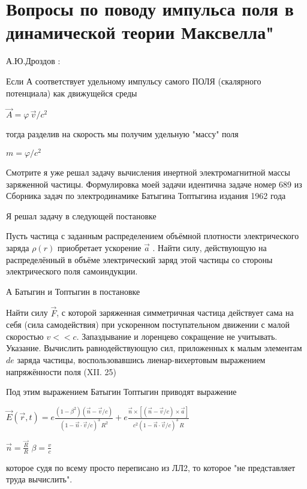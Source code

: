 \documentclass{article}
\begin{document}
 

\section{Вопросы по поводу импульса поля в динамической теории Максвелла"}
А.Ю.Дроздов : 

 Если А соответствует удельному импульсу самого ПОЛЯ (скалярного потенциала) как движущейся среды

$\vec{A} = \varphi\,\vec{v}/c^2$

тогда разделив на скорость мы получим удельную "массу" поля

$m = \varphi/c^2$ 

Смотрите я уже решал задачу вычисления инертной электромагнитной массы заряженной частицы. Формулировка моей задачи идентична задаче номер 689 из Сборника задач по электродинамике Батыгина Топтыгина издания 1962 года

Я решал задачу в следующей постановке

Пусть частица с заданным распределением объёмной плотности электрического заряда $\rho \left( r \right)$ приобретает ускорение $\overrightarrow{a}$ . Найти силу, действующую на распределённый в объёме электрический заряд этой частицы со стороны электрического поля самоиндукции.

А Батыгин и Топтыгин в постановке

Найти силу $\vec{F}$, с которой заряженная симметричная частица действует сама на себя (сила самодействия) при ускоренном поступательном движении с малой скоростью $v << c$. Запаздывание и лоренцево сокращение не учитывать.
Указание. Вычислить равнодействующую сил, приложенных к малым элементам $de$ заряда частицы, воспользовавшись лиенар-вихертовым выражением напряжённости поля (XII. 25)  

Под этим выражением Батыгин Топтыгин приводят выражение

$\vec{E}\left(\vec{r},t\right) = e \frac{\left(1-\beta^2\right) \left(\vec{n}-\vec{v}/c \right)}{\left(1-\vec{n}\cdot\vec{v}/c\right)^3\,R^2} + e \frac{ \vec{n} \times \left[ \left( \vec{n}-\vec{v}/c\right) \times \vec{a}\right]}{c^2 \left(1-\vec{n} \cdot \vec{v}/c \right)^3 \,R }$

$\vec{n}=\frac{\vec{R}}{R}$ $\beta=\frac{v}{c}$

которое судя по всему  просто переписано из ЛЛ2, то которое "не представляет труда вычислить".
\end{document}
